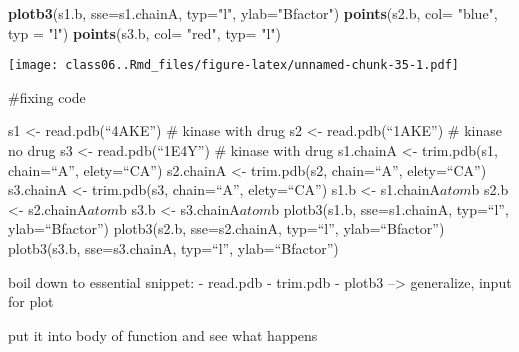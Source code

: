 \documentclass[]{article}
\newenvironment{Shaded}{\begin{snugshade}}{\end{snugshade}}
\newcommand{\DataTypeTok}[1]{\textcolor[rgb]{0.13,0.29,0.53}{#1}}
\newcommand{\KeywordTok}[1]{\textcolor[rgb]{0.13,0.29,0.53}{\textbf{#1}}}
\newcommand{\NormalTok}[1]{#1}
\newcommand{\StringTok}[1]{\textcolor[rgb]{0.31,0.60,0.02}{#1}}
\begin{document}
\begin{Shaded}
\begin{Highlighting}[]
\KeywordTok{plotb3}\NormalTok{(s1.b, }\DataTypeTok{sse=}\NormalTok{s1.chainA, }\DataTypeTok{typ=}\StringTok{"l"}\NormalTok{, }\DataTypeTok{ylab=}\StringTok{"Bfactor"}\NormalTok{)}
\KeywordTok{points}\NormalTok{(s2.b, }\DataTypeTok{col=} \StringTok{"blue"}\NormalTok{, }\DataTypeTok{typ =} \StringTok{"l"}\NormalTok{)}
\KeywordTok{points}\NormalTok{(s3.b, }\DataTypeTok{col=} \StringTok{"red"}\NormalTok{, }\DataTypeTok{typ=} \StringTok{"l"}\NormalTok{)}
\end{Highlighting}
\end{Shaded}

\texttt{[image: class06..Rmd\_files/figure-latex/unnamed-chunk-35-1.pdf]}

\#fixing code

s1 \textless{}- read.pdb(``4AKE'') \# kinase with drug s2 \textless{}-
read.pdb(``1AKE'') \# kinase no drug s3 \textless{}- read.pdb(``1E4Y'')
\# kinase with drug s1.chainA \textless{}- trim.pdb(s1, chain=``A'',
elety=``CA'') s2.chainA \textless{}- trim.pdb(s2, chain=``A'',
elety=``CA'') s3.chainA \textless{}- trim.pdb(s3, chain=``A'',
elety=``CA'') s1.b \textless{}- s1.chainA\(atom\)b s2.b \textless{}-
s2.chainA\(atom\)b s3.b \textless{}- s3.chainA\(atom\)b plotb3(s1.b,
sse=s1.chainA, typ=``l'', ylab=``Bfactor'') plotb3(s2.b, sse=s2.chainA,
typ=``l'', ylab=``Bfactor'') plotb3(s3.b, sse=s3.chainA, typ=``l'',
ylab=``Bfactor'')

boil down to essential snippet: - read.pdb - trim.pdb - plotb3
--\textgreater{} generalize, input for plot

put it into body of function and see what happens
\end{document}
